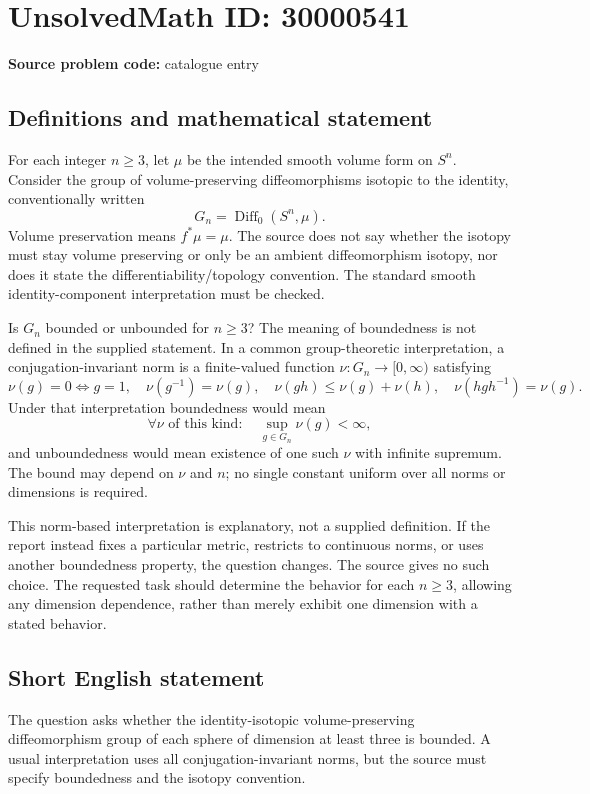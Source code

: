 \documentclass[11pt]{article}
\begin{document}
\section*{UnsolvedMath ID: 30000541}
\textbf{Source problem code:} catalogue entry
\subsection{Definitions and mathematical statement}
For each integer $n\ge3$, let $\mu$ be the intended smooth volume form on $S^n$. Consider the group of volume-preserving diffeomorphisms isotopic to the identity, conventionally written
\[
 G_n=\operatorname{Diff}_0(S^n,\mu).
\]
Volume preservation means $f^*\mu=\mu$. The source does not say whether the isotopy must stay volume preserving or only be an ambient diffeomorphism isotopy, nor does it state the differentiability/topology convention. The standard smooth identity-component interpretation must be checked.

Is $G_n$ bounded or unbounded for $n\ge3$? The meaning of boundedness is not defined in the supplied statement. In a common group-theoretic interpretation, a conjugation-invariant norm is a finite-valued function $\nu:G_n\to[0,\infty)$ satisfying
\[
 \nu(g)=0\Longleftrightarrow g=1,\quad
 \nu(g^{-1})=\nu(g),\quad
 \nu(gh)\le\nu(g)+\nu(h),\quad
 \nu(hgh^{-1})=\nu(g).
\]
Under that interpretation boundedness would mean
\[
 \forall\nu\text{ of this kind}:\quad\sup_{g\in G_n}\nu(g)<\infty,
\]
and unboundedness would mean existence of one such $\nu$ with infinite supremum. The bound may depend on $\nu$ and $n$; no single constant uniform over all norms or dimensions is required.

This norm-based interpretation is explanatory, not a supplied definition. If the report instead fixes a particular metric, restricts to continuous norms, or uses another boundedness property, the question changes. The source gives no such choice. The requested task should determine the behavior for each $n\ge3$, allowing any dimension dependence, rather than merely exhibit one dimension with a stated behavior.
\subsection{Short English statement}
The question asks whether the identity-isotopic volume-preserving diffeomorphism group of each sphere of dimension at least three is bounded. A usual interpretation uses all conjugation-invariant norms, but the source must specify boundedness and the isotopy convention.
\end{document}
